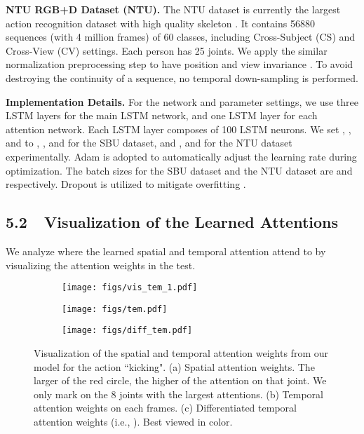 \documentclass[letterpaper]{article}
\begin{document}
\textbf{NTU RGB+D Dataset (NTU).} The NTU dataset is currently the largest action recognition dataset with high quality skeleton \cite{Shahroudy_2016_CVPR}. It contains 56880 sequences (with 4 million frames) of 60 classes, including Cross-Subject (CS) and Cross-View (CV) settings. Each person has 25 joints. We apply the similar normalization preprocessing step to have position and view invariance \cite{Shahroudy_2016_CVPR}. To avoid destroying the continuity of a sequence, no temporal down-sampling is performed.


\textbf{Implementation Details.} For the network and parameter settings, we use three LSTM layers for the main LSTM network, and one LSTM layer for each attention network. Each LSTM layer composes of 100 LSTM neurons. We set , , and  to , , and  for the SBU dataset, and ,  and  for the NTU dataset experimentally. Adam \cite{kingma2014adam} is adopted to automatically adjust the learning rate during optimization. The batch sizes for the SBU dataset and the NTU dataset are  and  respectively. Dropout is utilized to mitigate overfitting \cite{ICLR15DropoutLSTM}.





\subsection{5.2~~Visualization of the Learned Attentions}
We analyze where the learned spatial and temporal attention attend to by visualizing the attention weights in the test.
\begin{figure}[http]
	\vspace{-3mm}
	\centering
	\begin{subfigure}[t]{0.36\textwidth}
		\centering\texttt{[image: figs/vis\_tem\_1.pdf]}
		\vspace{-2mm}
		\caption{}
		\label{fig:vis_tem_skeleton}
	\end{subfigure}
	
	\begin{subfigure}[t]{0.22\textwidth}
		\centering\texttt{[image: figs/tem.pdf]}
		\vspace{-2.2mm}
		\caption{}
		\label{fig:skeleton2}
	\end{subfigure}
	\begin{subfigure}[t]{0.22\textwidth}
		\centering\texttt{[image: figs/diff\_tem.pdf]}
		\vspace{-2.2mm}
		\caption{}
		\label{fig:skeleton2}
	\end{subfigure}
	\vspace{-4mm}
	\caption[]{Visualization of the spatial and temporal attention weights from our model for the action ``kicking". (a) Spatial attention weights. The larger of the red circle, the higher of the attention on that joint. We only mark on the 8 joints with the largest attentions. (b) Temporal attention weights  on each frames. (c) Differentiated temporal attention weights (i.e., ). Best viewed in color.}\label{fig:discuss}
\end{figure}
\vspace{-2mm}
\end{document}
